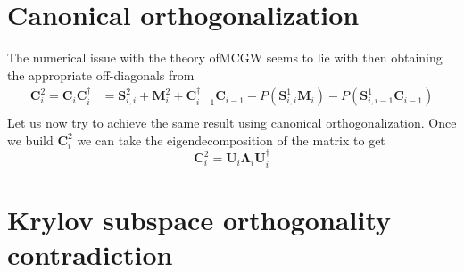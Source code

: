 \section{Canonical orthogonalization}
\label{sec:canonical_orthogonalization}
The numerical issue with the theory ofMCGW seems to lie with then obtaining the appropriate off-diagonals from
\begin{align}
    \bm{C}_i^2=\bm{C}_i\bm{C}_i^{\dag} &= {\bm{S}_{i,i}^2+\bm{M}_i^2+\bm{C}_{i-1}^{\dag}\bm{C}_{i-1}-P\left(\bm{S}_{i,i}^{1}\bm{M}_i\right) - P\left(\bm{S}_{i,i-1}^{1}\bm{C}_{i-1}\right)}\\
    \label{eqn:cholesky_recurrence}
\end{align}
Let us now try to achieve the same result using canonical orthogonalization. Once we build $\bm{C}_i^2$ we can take the eigendecomposition of the matrix to get 
\begin{equation}
    \bm{C}_i^2 = \bm{U}_i \bm{\Lambda}_i \bm{U}_i^{\dagger}
\end{equation}
\section{Krylov subspace orthogonality contradiction}
\label{sec:krylov_subspace_orthogonality_contradiction}
